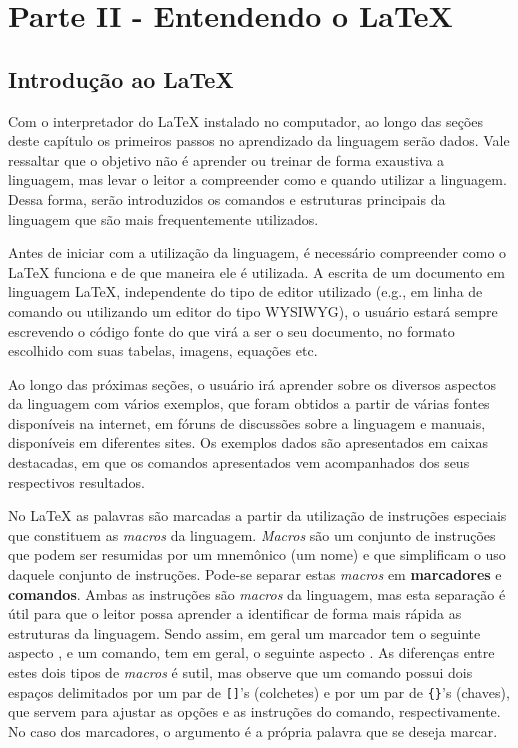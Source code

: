 \chapter{Parte II - Entendendo o \LaTeX{}}
\label{cap:parteII}

\section{Introdução ao \LaTeX{}}
\label{sec:intro_latex}

Com o interpretador do \LaTeX{} instalado no computador, ao longo das seções deste capítulo os primeiros passos no aprendizado da linguagem serão dados. Vale ressaltar que o objetivo não é aprender ou treinar de forma exaustiva a linguagem, mas levar o leitor a compreender como e quando utilizar a linguagem. Dessa forma, serão introduzidos os comandos e estruturas principais da linguagem que são mais frequentemente utilizados.

Antes de iniciar com a utilização da linguagem, é necessário compreender como o \LaTeX{} funciona e de que maneira ele é utilizada. A escrita de um documento em linguagem \LaTeX{}, independente do tipo de editor utilizado (e.g., em linha de comando ou utilizando um editor do tipo WYSIWYG), o usuário estará sempre escrevendo o código fonte do que virá a ser o seu documento, no formato escolhido com suas tabelas, imagens, equações etc.

Ao longo das próximas seções, o usuário irá aprender sobre os diversos aspectos da linguagem com vários exemplos, que foram obtidos a partir de várias fontes disponíveis na internet, em fóruns de discussões sobre a linguagem e manuais, disponíveis em diferentes sites. Os exemplos dados são apresentados em caixas destacadas, em que os comandos apresentados vem acompanhados dos seus respectivos resultados.

No \LaTeX{} as palavras são marcadas a partir da utilização de instruções especiais que constituem as \textit{macros} da linguagem. \textit{Macros} são um conjunto de instruções que podem ser resumidas por um mnemônico (um nome) e que simplificam o uso daquele conjunto de instruções. Pode-se separar estas \textit{macros} em \textbf{marcadores} e \textbf{comandos}. Ambas as instruções são \textit{macros} da linguagem, mas esta separação é útil para que o leitor possa aprender a identificar de forma mais rápida as estruturas da linguagem. Sendo assim, em geral um marcador tem o seguinte aspecto \texttt{\marcador{}}, e um comando, tem em geral, o seguinte aspecto \texttt{\comando[]{}}. As diferenças entre estes dois tipos de \textit{macros} é sutil, mas observe que um comando possui dois espaços delimitados por um par de {\tt []}'s (colchetes) e por um par de {\tt \{\}}'s (chaves), que servem para ajustar as opções e as instruções do comando, respectivamente. No caso dos marcadores, o argumento é a própria palavra que se deseja marcar.

